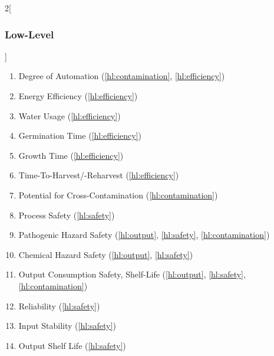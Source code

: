 \documentclass{../tex/report}
\begin{document}
\begin{multicols}{2}[\subsubsection{Low-Level}\label{sec:llos}]
\begin{enumerate}[label=LL\arabic*., ref=LL\arabic*]
        \item \label{ll:automation} Degree of Automation \hfill (\ref{hl:contamination}, \ref{hl:efficiency})
        \item \label{ll:efficiency_energy} Energy Efficiency \hfill (\ref{hl:efficiency})
        \item \label{ll:efficiency_water} Water Usage \hfill (\ref{hl:efficiency})
        \item \label{ll:time_germination} Germination Time \hfill (\ref{hl:efficiency})
        \item \label{ll:time_growth} Growth Time \hfill (\ref{hl:efficiency})
        \item \label{ll:time_harvest} Time-To-Harvest/-Reharvest \hfill (\ref{hl:efficiency})
        \item \label{ll:crosscontamination} Potential for Cross-Contamination \hfill (\ref{hl:contamination})
        \item \label{ll:safety_process} Process Safety \hfill (\ref{hl:safety})
        \item \label{ll:safety_pathogen} Pathogenic Hazard Safety \hfill (\ref{hl:output}, \ref{hl:safety}, \ref{hl:contamination})
        \item \label{ll:safety_chemical} Chemical Hazard Safety \hfill (\ref{hl:output}, \ref{hl:safety})
        \item \label{ll:output_safety} Output Consumption Safety, Shelf-Life \hfill (\ref{hl:output}, \ref{hl:safety}, \ref{hl:contamination})
        \item \label{ll:reliability} Reliability \hfill (\ref{hl:safety})
        \item \label{ll:stability_input} Input Stability \hfill (\ref{hl:safety})
        \item \label{ll:stability_output} Output Shelf Life \hfill (\ref{hl:safety})

\end{enumerate}
\end{multicols}
\end{document}
